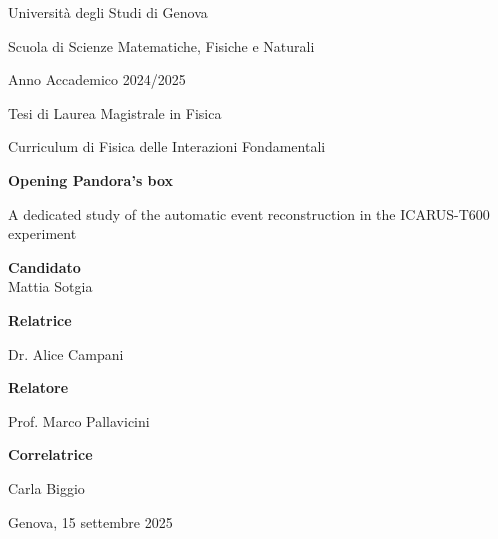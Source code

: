 \begin{titlepage}
    \ifdraft\BgThispage\fi
    \begin{center}
        
        {{Università degli Studi di Genova}}\par

        {Scuola di Scienze Matematiche, Fisiche e Naturali} \par

        \vspace{0.5cm}

        {Anno Accademico 2024/2025}

        \vfill

        Tesi di Laurea Magistrale in Fisica\par
        Curriculum di Fisica delle Interazioni Fondamentali

        \vfill

        \begin{minipage}{0.775\linewidth}
            \centering
            \huge
            \bfseries
            {\LARGE Opening Pandora's box}\par%
            {\Large A dedicated study of the automatic event reconstruction in the ICARUS-T600 experiment}%
        \end{minipage}

        \vfill

        \textbf{\small Candidato}\\{Mattia Sotgia}%
%
        \vfill%

        \begin{minipage}{0.45\linewidth}%
            \textbf{\small Relatrice}\par%
            {Dr. Alice Campani}\par\vspace{1em}%
            \textbf{\small Relatore}\par%
            {Prof. Marco Pallavicini}%
        \end{minipage}%
        \hfill%
        \begin{minipage}{0.45\linewidth}
            \raggedleft
            \textbf{\small Correlatrice}\par
            {Carla Biggio}
        \end{minipage}

        \vspace{2cm}

		Genova, 15 settembre 2025
    \end{center}
\end{titlepage}
